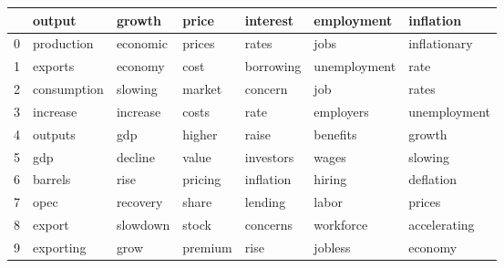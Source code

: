 \begin{tabular}{lllllll}
\toprule
{} &       output &    growth &    price &   interest &    employment &     inflation \\
\midrule
0 &   production &  economic &   prices &      rates &          jobs &  inflationary \\
1 &      exports &   economy &     cost &  borrowing &  unemployment &          rate \\
2 &  consumption &   slowing &   market &    concern &           job &         rates \\
3 &     increase &  increase &    costs &       rate &     employers &  unemployment \\
4 &      outputs &       gdp &   higher &      raise &      benefits &        growth \\
5 &          gdp &   decline &    value &  investors &         wages &       slowing \\
6 &      barrels &      rise &  pricing &  inflation &        hiring &     deflation \\
7 &         opec &  recovery &    share &    lending &         labor &        prices \\
8 &       export &  slowdown &    stock &   concerns &     workforce &  accelerating \\
9 &    exporting &      grow &  premium &       rise &       jobless &       economy \\
\bottomrule
\end{tabular}
